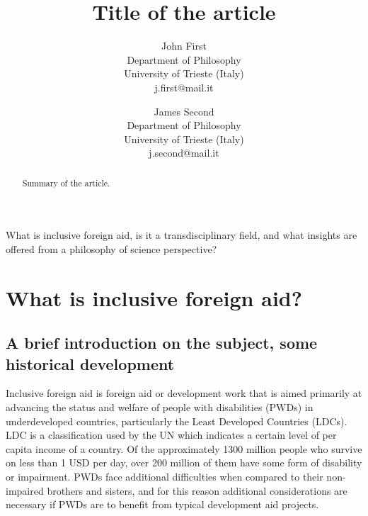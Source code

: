 \documentclass{lps}
\begin{document}
\title{Title of the article}
\author{John First\\Department of Philosophy\\University of Trieste (Italy)\\j.first@mail.it \and%
            James Second\\Department of Philosophy\\University of Trieste (Italy)\\j.second@mail.it}

\maketitle
\tableofcontents


\begin{abstract}
Summary of the article.
\end{abstract}



What is inclusive foreign aid, is it a transdisciplinary field, and what
insights are offered from a philosophy of science perspective?

\section{What is inclusive foreign aid?}

\subsection{A brief introduction on the subject, some historical development}

Inclusive foreign aid is foreign aid or development work that is aimed
primarily at advancing the status and welfare of people with disabilities
(PWDs) in underdeveloped countries, particularly the Least Developed Countries
(LDCs). LDC is a classification used by the UN which indicates a certain level
of per capita income of a country. Of the approximately 1300 million people
who survive on less than 1 USD per day, over 200 million of them have some
form of disability or impairment. PWDs face additional difficulties when
compared to their non-impaired brothers and sisters, and for this reason
additional considerations are necessary if PWDs are to benefit from typical
development aid projects. 
\end{document}
